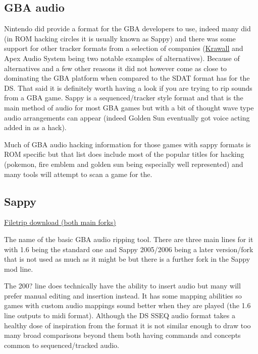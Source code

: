 \documentclass[
]{book}
\begin{document}
\hypertarget{gba-audio}{%
\subsection{GBA audio}\label{gba-audio}}

Nintendo did provide a format for the GBA developers to use, indeed many did (in ROM hacking circles it is usually known as Sappy) and there was some support for other tracker formats from a selection of companies (\href{http://knzl.de/krawall/}{Krawall} and Apex Audio System being two notable examples of alternatives). Because of alternatives and a few other reasons it did not however come as close to dominating the GBA platform when compared to the SDAT format has for the DS. That said it is definitely worth having a look if you are trying to rip sounds from a GBA game. Sappy is a sequenced/tracker style format and that is the main method of audio for most GBA games but with a bit of thought wave type audio arrangements can appear (indeed Golden Sun eventually got voice acting added in as a hack).

Much of GBA audio hacking information for those games with sappy formats is ROM specific but that list does include most of the popular titles for hacking (pokemon, fire emblem and golden sun being especially well represented) and many tools will attempt to scan a game for the.

\hypertarget{sappy}{%
\subsection{Sappy}\label{sappy}}

\href{http://filetrip.net/gba-downloads/tools-utilities/download-sappy-2006-f9566.html}{Filetrip download (both main forks)}

The name of the basic GBA audio ripping tool. There are three main lines for it with 1.6 being the standard one and Sappy 2005/2006 being a later version/fork that is not used as much as it might be but there is a further fork in the Sappy mod line.

The 200? line does technically have the ability to insert audio but many will prefer manual editing and insertion instead. It has some mapping abilities so games with custom audio mappings sound better when they are played (the 1.6 line outputs to midi format). Although the DS SSEQ audio format takes a healthy dose of inspiration from the format it is not similar enough to draw too many broad comparisons beyond them both having commands and concepts common to sequenced/tracked audio.
\end{document}
